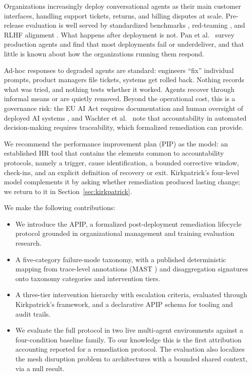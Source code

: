 \documentclass[conference]{IEEEtran}
\begin{document}
Organizations increasingly deploy conversational agents as their main customer
interfaces, handling support tickets, returns, and billing disputes at scale.
Pre-release evaluation is well served by standardized benchmarks
\cite{liang2022}, red-teaming \cite{ganguli2022}, and RLHF alignment
\cite{ouyang2022}. What happens after deployment is not. Pan et al.\
\cite{pan2025} survey production agents and find that most deployments fail or
underdeliver, and that little is known about how the organizations running them
respond.

Ad-hoc responses to degraded agents are standard: engineers ``fix'' individual
prompts, product managers file tickets, systems get rolled back. Nothing
records what was tried, and nothing tests whether it worked. Agents recover
through informal means or are quietly removed. Beyond the operational cost,
this is a governance risk: the EU AI Act requires documentation and human
oversight of deployed AI systems \cite{euaiact}, and Wachter et al.\
\cite{wachter2017} note that accountability in automated decision-making
requires traceability, which formalized remediation can provide.

We recommend the performance improvement plan (PIP) as the model: an
established HR tool that contains the elements common to accountability
protocols, namely a trigger, cause identification, a bounded corrective window,
check-ins, and an explicit definition of recovery or exit. Kirkpatrick's
four-level model \cite{kirkpatrick1994} complements it by asking whether
remediation produced lasting change; we return to it in
Section~\ref{sec:kirkpatrick}.

We make the following contributions:

\begin{itemize}
  \item We introduce the APIP, a formalized post-deployment remediation
  lifecycle protocol grounded in organizational management and training
  evaluation research.

  \item A five-category failure-mode taxonomy, with a published deterministic
  mapping from trace-level annotations (MAST \cite{cemri2025}) and
  disaggregation signatures onto taxonomy categories and intervention tiers.

  \item A three-tier intervention hierarchy with escalation criteria, evaluated
  through Kirkpatrick's framework, and a declarative APIP schema for tooling
  and audit trails.

  \item We evaluate the full protocol in two live multi-agent environments
  against a four-condition baseline family. To our knowledge this is the first
  attribution accounting reported for a remediation protocol. The evaluation
  also localizes the mesh disruption problem to architectures with a bounded
  shared context, via a null result.
\end{itemize}
\end{document}
